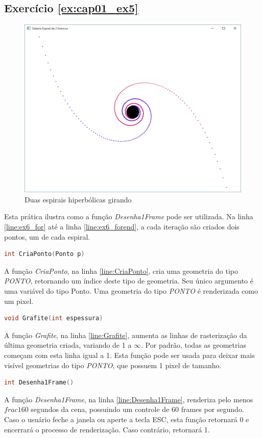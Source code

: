 \subsection*{Exercício \ref{ex:cap01_ex5}}
\begin{figure}[ht]
  \centerline{\includegraphics[width=.5\textwidth]{img/cap1_ex6.png}}
  \caption{Duas espirais hiperbólicas girando}
  \label{fig:cap01_ex5}
\end{figure}
Esta prática ilustra como a função \emph{Desenha1Frame} pode ser utilizada. Na linha \ref{line:ex6_for} até a linha \ref{line:ex6_forend}, a cada iteração são criados dois pontos, um de cada espiral.



\begin{lstlisting}[label={func:CriaPonto},language=C++]
int CriaPonto(Ponto p)
\end{lstlisting}
A função \emph{CriaPonto}, na linha \ref{line:CriaPonto}, cria uma geometria do tipo \emph{PONTO}, retornando um índice deste tipo de geometria. Seu único argumento é uma variável do tipo Ponto. Uma geometria do tipo \emph{PONTO} é renderizada como um pixel.

\begin{lstlisting}[label={func:Grafite},language=C++]
void Grafite(int espessura)
\end{lstlisting}
A função \emph{Grafite}, na linha \ref{line:Grafite}, aumenta as linhas de rasterização da última geometria criada, variando de 1 a $\infty$. Por padrão, todas as geometrias começam com esta linha igual a 1. Esta função pode ser usada para deixar mais visível geometrias do tipo \emph{PONTO}, que possuem 1 pixel de tamanho.

\begin{lstlisting}[label={func:Desenha1Frame},language=C++]
int Desenha1Frame()
\end{lstlisting}
A função \emph{Desenha1Frame}, na linha \ref{line:Desenha1Frame}, renderiza pelo menos $frac{1}{60}$ segundos da cena, possuindo um controle de 60 frames por segundo. Caso o usuário feche a janela ou aperte a tecla ESC, esta função retornará 0 e encerrará o processo de renderização. Caso contrário, retornará 1.

